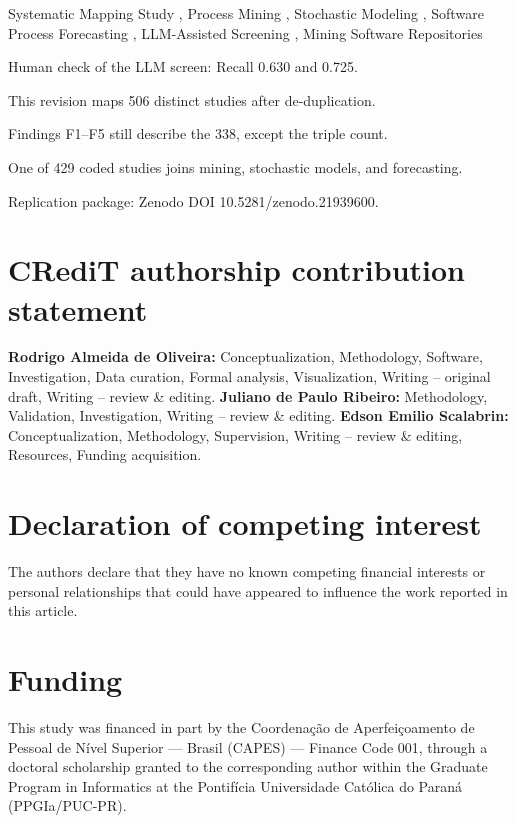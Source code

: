 \documentclass[review,3p,times]{elsarticle}
\begin{document}
\begin{frontmatter}
\begin{keyword}
Systematic Mapping Study \sep
Process Mining \sep
Stochastic Modeling \sep
Software Process Forecasting \sep
LLM-Assisted Screening \sep
Mining Software Repositories
\end{keyword}

\begin{highlights}
\item Human check of the LLM screen: Recall 0.630 and 0.725.
\item This revision maps 506 distinct studies after de-duplication.
\item Findings F1--F5 still describe the 338, except the triple count.
\item One of 429 coded studies joins mining, stochastic models, and forecasting.
\item Replication package: Zenodo DOI 10.5281/zenodo.21939600.
\end{highlights}

\end{frontmatter}



\section*{CRediT authorship contribution statement}
\textbf{Rodrigo Almeida de Oliveira:} Conceptualization, Methodology,
Software, Investigation, Data curation, Formal analysis, Visualization,
Writing -- original draft, Writing -- review \& editing.
\textbf{Juliano de Paulo Ribeiro:} Methodology, Validation, Investigation,
Writing -- review \& editing.
\textbf{Edson Emilio Scalabrin:} Conceptualization, Methodology,
Supervision, Writing -- review \& editing, Resources, Funding acquisition.

\section*{Declaration of competing interest}
The authors declare that they have no known competing financial interests
or personal relationships that could have appeared to influence the work
reported in this article.

\section*{Funding}
This study was financed in part by the Coordena\c c\~ao de Aperfei\c
coamento de Pessoal de N\'ivel Superior --- Brasil (CAPES) --- Finance
Code 001, through a doctoral scholarship granted to the corresponding
author within the Graduate Program in Informatics at the Pontif\'icia
Universidade Cat\'olica do Paran\'a (PPGIa/PUC-PR).
\end{document}
